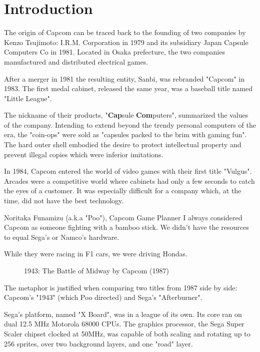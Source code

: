 \chapter{Introduction} 

The origin of Capcom can be traced back to the founding of two companies by Kenzo Tsujimoto: I.R.M. Corporation in 1979 and its subsidiary Japan Capsule Computers Co in 1981. Located in Osaka prefecture, the two companies manufactured and distributed electrical games.

After a merger in 1981 the resulting entity, Sanbi, was rebranded "Capcom" in 1983. The first medal cabinet\cite{medal}, released the same year, was a baseball title named "Little League".

The nickname of their products, "\textbf{Cap}sule \textbf{Com}puters", summarized the values of the company. Intending to extend beyond the trendy personal computers of the era, the "coin-ops" were sold as "capsules packed to the brim with gaming fun". The hard outer shell embodied the desire to protect intellectual property and prevent illegal copies which were inferior imitations.


 In 1984, Capcom entered the world of video games with their first title "Vulgus".
Arcades were a competitive world where cabinets had only a few seconds to catch the eyes of a customer. It was especially difficult for a company which, at the time, did not have the best technology.

\begin{q}{Noritaka Funamizu (a.k.a "Poo"), Capcom Game Planner\cite{planner}}
I always considered Capcom as someone fighting with a bamboo stick. We didn't have the resources to equal Sega's or Namco's hardware. 

While they were racing in F1 cars, we were driving Hondas.
\end{q}


\begin{figure}[H]
\caption*{1943: The Battle of Midway by Capcom (1987)}
\end{figure}

The metaphor is justified when comparing two titles from 1987 side by side: Capcom's "1943" (which Poo directed) and Sega's "Afterburner".

Sega's platform, named "X Board", was in a league of its own. Its core ran on dual 12.5 MHz Motorola 68000 CPUs. The graphics processor, the Sega Super Scaler chipset clocked at 50MHz, was capable of both scaling and rotating up to 256 sprites, over two background layers, and one "road" layer. 

